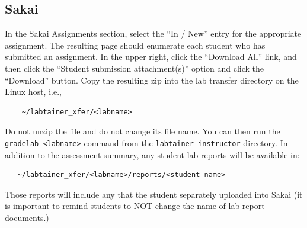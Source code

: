 \documentclass[12pt]{article}
\begin{document}
\subsection{Sakai}
In the Sakai Assignments section, select the ``In / New'' entry for the appropriate assignment.
The resulting page should enumerate each student who has submitted an assignment.  In the upper right,
click the ``Download All'' link, and then click the ``Student submission attachment(s)'' option and
click the ``Download'' button.  Copy the resulting zip into the lab transfer directory 
on the Linux host, i.e.,
\begin{verbatim}
    ~/labtainer_xfer/<labname>
\end{verbatim}
\noindent Do not unzip the file and do not change its file name.
You can then run the {\tt gradelab <labname>} command from the {\tt labtainer-instructor} directory.
In addition to the assessment summary, any student lab reports will be available in:
\begin{verbatim}
   ~/labtainer_xfer/<labname>/reports/<student name> 
\end{verbatim}
\noindent Those reports will include any that the student separately uploaded into Sakai (it is 
important to remind students to NOT change the name of lab report documents.)
\end{document}
